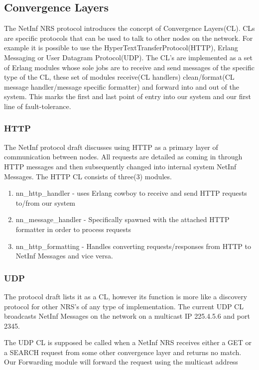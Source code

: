 \subsection {Convergence Layers}

The NetInf NRS protocol introduces the concept of Convergence Layers(CL). CLs are specific protocols that can be used to talk to other nodes on the network. For example it is possible to use the HyperTextTransferProtocol(HTTP), Erlang Messaging or User Datagram Protocol(UDP). The CL's are implemented as a set of Erlang modules whose sole jobs are to receive and send messages of the specific type of the CL, these set of modules  receive(CL handlers) clean/format(CL message handler/message specific formatter) and forward into and out of the system. This marks the first and last point of entry into our system and our first line of fault-tolerance. 

\subsubsection{HTTP}

The NetInf protocol draft discusses using HTTP as a primary layer of communication between nodes. All requests are detailed as coming in through HTTP messages and then subsequently changed into internal system NetInf Messages. The HTTP CL consists of three(3) modules. 

\begin{enumerate}
\item nn\_http\_handler - uses Erlang cowboy to receive and send HTTP requests to/from our system
\item nn\_message\_handler - Specifically spawned with the attached HTTP formatter in order to process requests
\item nn\_http\_formatting - Handles converting requests/responses from HTTP  to NetInf Messages and vice versa.
\end{enumerate}


\subsubsection{UDP}

The protocol draft lists it as a CL, however its function is more like a discovery protocol for other NRS's of any type of implementation. The current UDP CL broadcasts NetInf Messages on the network on a multicast IP 225.4.5.6 and port 2345. 

The UDP CL is supposed be called when a NetInf NRS receives either a GET or a SEARCH request from some other convergence layer and returns no match. Our Forwarding module will forward the request using the multicast address

